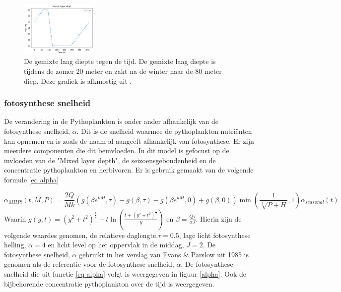\begin{figure}[H]
    \centering
    \includegraphics[width=0.33\textwidth]{figures/alpha/mixedlayerdept.png}
    \caption{De gemixte laag diepte tegen de tijd. De gemixte laag diepte is tijdens de zomer 20 meter en zakt na de winter naar de 80 meter diep. Deze grafiek is afkmostig uit \cite{Algen1985}.}
    \label{fig:mixedlayerdept}
\end{figure}

\subsubsection{fotosynthese snelheid}
De verandering in de Pythoplankton is onder ander afhankelijk van de fotosynthese snelheid, $\alpha$. Dit is de snelheid waarmee de pythoplankton nutriënten kan opnemen en is zoals de naam al aangeeft afhankelijk van fotosynthese. Er zijn meerdere componenten die dit beïnvloeden. In dit model is gefocust op de invloeden van de "Mixed layer depth", de seizoensgebondenheid en de concentratie pythoplankton en herbivoren. Er is gebruik gemaakt van de volgende formule \eqref{eq alpha}

\begin{equation}
    \alpha_{MHPt}(t,M,P)=\frac{2Q}{Mk}\left(g(\beta e^{kM},\tau)-g(\beta,\tau)-g(\beta e^{kM},0)+g(\beta,0) \right)\min(\frac{1}{\sqrt[3]{P+H}},1)\alpha_{seasonal}(t)
    \label{eq alpha}
\end{equation}
Waarin $g(y,t)=(y^2+t^2)^{\frac{1}{2}}-t\ln\left({\frac{t+(y^2+t^2)^{\frac{1}{2}}}{y}}\right)$ en $\beta=\frac{Q\tau}{\alpha J}$.
Hierin zijn de volgende waardes genomen, de relatieve daglengte,$\tau=0.5$, lage licht fotosynthese helling, $\alpha=4$ en licht level op het oppervlak in de middag, $J=2$.
De fotosynthese snelheid, $\alpha$ gebruikt in het verslag van Evans \& Parslow uit 1985 is genomen als de referentie voor de fotosynthese snelheid, $\alpha$.
De fotosynthese snelheid die uit functie \eqref{eq alpha} volgt is weergegeven in figuur \ref{alpha}. Ook de bijbehorende concentratie pythoplankton over de tijd is weergegeven.

